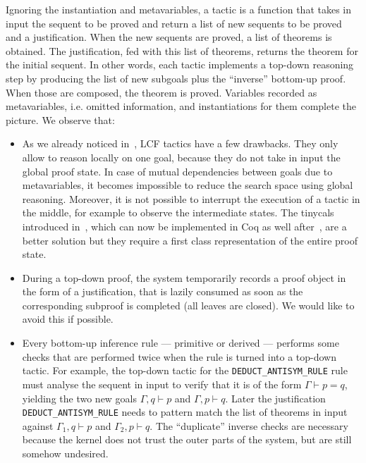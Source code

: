 \documentclass[preprint]{sigplanconf}
\begin{document}
Ignoring the instantiation and metavariables, a tactic is a function that takes in input the sequent to be proved and return a list of new sequents to be proved and a justification. When the new sequents are proved, a list of theorems is obtained. The justification, fed with this list of theorems, returns the theorem for the initial sequent. In other words, each tactic implements a top-down reasoning step by producing the list of new subgoals plus the ``inverse'' bottom-up proof. When those are composed, the theorem is proved. Variables recorded as metavariables, i.e. omitted information, and instantiations for them complete the picture.
We observe that:
\begin{itemize}
\item As we already noticed in~\cite{csc2}, LCF tactics have a few drawbacks. They only allow to reason locally on one goal, because they do not take in input the global proof state. In case of mutual dependencies between goals due to metavariables, it becomes impossible to reduce the search space using global reasoning. Moreover, it is not possible to interrupt the execution of a tactic in the middle, for example to observe the intermediate states. The tinycals introduced in~\cite{csc2}, which can now be implemented in Coq as well after~\cite{spiwack}, are a better solution but they require a first class representation of the entire proof state.
\item During a top-down proof, the system temporarily records a proof object in the form of a justification, that is lazily consumed as soon as the corresponding subproof is completed (all leaves are closed). We would like to avoid this if possible.
\item Every bottom-up inference rule --- primitive or derived --- performs some checks that are performed twice when the rule is turned into a top-down tactic.
For example, the top-down tactic for the \verb+DEDUCT_ANTISYM_RULE+ rule must analyse the sequent in input to verify that it is of the form $\Gamma \vdash p=q$, yielding the two new goals $\Gamma, q \vdash p$ and $\Gamma, p \vdash q$. Later the justification \verb+DEDUCT_ANTISYM_RULE+ needs to pattern match the list of theorems in input against $\Gamma_1,q \vdash p$ and $\Gamma_2,p \vdash q$. The ``duplicate'' inverse checks are necessary because the kernel does not trust the outer parts of the system, but are still somehow undesired.
\end{itemize}
\end{document}
